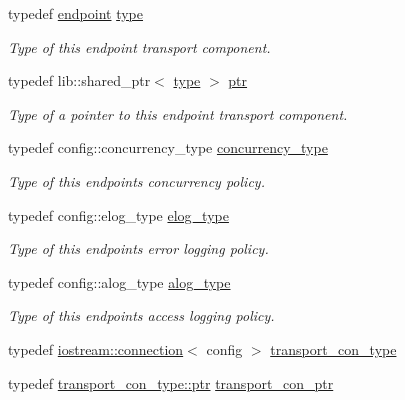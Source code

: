 \begin{DoxyCompactItemize}
\item 
typedef \hyperlink{classwebsocketpp_1_1transport_1_1iostream_1_1endpoint}{endpoint} \hyperlink{classwebsocketpp_1_1transport_1_1iostream_1_1endpoint_abc21958efa2ee99de526036fb21f5320}{type}
\begin{DoxyCompactList}\small\item\em Type of this endpoint transport component. \end{DoxyCompactList}\item 
typedef lib\+::shared\+\_\+ptr$<$ \hyperlink{classwebsocketpp_1_1transport_1_1iostream_1_1endpoint_abc21958efa2ee99de526036fb21f5320}{type} $>$ \hyperlink{classwebsocketpp_1_1transport_1_1iostream_1_1endpoint_a508eb595a20c2b0a15a27d68a7c0bd93}{ptr}
\begin{DoxyCompactList}\small\item\em Type of a pointer to this endpoint transport component. \end{DoxyCompactList}\item 
typedef config\+::concurrency\+\_\+type \hyperlink{classwebsocketpp_1_1transport_1_1iostream_1_1endpoint_ad7787af753771da00bf8e6477e52b615}{concurrency\+\_\+type}
\begin{DoxyCompactList}\small\item\em Type of this endpoint\textquotesingle{}s concurrency policy. \end{DoxyCompactList}\item 
typedef config\+::elog\+\_\+type \hyperlink{classwebsocketpp_1_1transport_1_1iostream_1_1endpoint_a0aafebd80866c13bef4caa45e48a8ede}{elog\+\_\+type}
\begin{DoxyCompactList}\small\item\em Type of this endpoint\textquotesingle{}s error logging policy. \end{DoxyCompactList}\item 
typedef config\+::alog\+\_\+type \hyperlink{classwebsocketpp_1_1transport_1_1iostream_1_1endpoint_af176dc3a44caefab71de271c27873c81}{alog\+\_\+type}
\begin{DoxyCompactList}\small\item\em Type of this endpoint\textquotesingle{}s access logging policy. \end{DoxyCompactList}\item 
typedef \hyperlink{classwebsocketpp_1_1transport_1_1iostream_1_1connection}{iostream\+::connection}$<$ config $>$ \hyperlink{classwebsocketpp_1_1transport_1_1iostream_1_1endpoint_a01827f94c5d01289975146f0438ee79b}{transport\+\_\+con\+\_\+type}
\item 
typedef \hyperlink{classwebsocketpp_1_1transport_1_1iostream_1_1connection_a054436e87f6dc4404b13f6131707d2ab}{transport\+\_\+con\+\_\+type\+::ptr} \hyperlink{classwebsocketpp_1_1transport_1_1iostream_1_1endpoint_a709bba4a4e1e2b7829abe4aa55de8078}{transport\+\_\+con\+\_\+ptr}
\end{DoxyCompactItemize}
